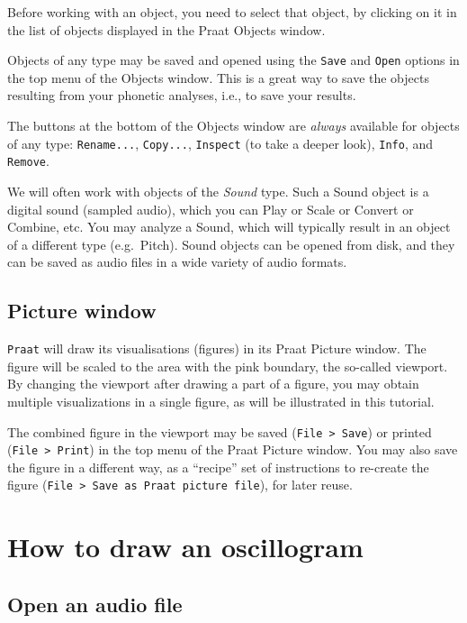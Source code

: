 \documentclass[
]{book}
\begin{document}
Before working with an object, you need to select that object, by clicking on it in the list of objects displayed in the Praat Objects window.

Objects of any type may be saved and opened using the \texttt{Save} and \texttt{Open} options in the top menu of the Objects window. This is a great way to save the objects resulting from your phonetic analyses, i.e., to save your results.

The buttons at the bottom of the Objects window are \emph{always} available for objects of any type: \texttt{Rename...}, \texttt{Copy...}, \texttt{Inspect} (to take a deeper look), \texttt{Info}, and \texttt{Remove}.

We will often work with objects of the \emph{Sound} type. Such a Sound object is a digital sound (sampled audio), which you can Play or Scale or Convert or Combine, etc. You may analyze a Sound, which will typically result in an object of a different type (e.g.~Pitch). Sound objects can be opened from disk, and they can be saved as audio files in a wide variety of audio formats.

\subsection*{Picture window}\label{picture-window}

\texttt{Praat} will draw its visualisations (figures) in its Praat Picture window. The figure will be scaled to the area with the pink boundary, the so-called viewport. By changing the viewport after drawing a part of a figure, you may obtain multiple visualizations in a single figure, as will be illustrated in this tutorial.

The combined figure in the viewport may be saved (\texttt{File\ \textgreater{}\ Save}) or printed (\texttt{File\ \textgreater{}\ Print}) in the top menu of the Praat Picture window.
You may also save the figure in a different way, as a ``recipe'' set of instructions to re-create the figure (\texttt{File\ \textgreater{}\ Save\ as\ Praat\ picture\ file}), for later reuse.

\label{box-open}
\section{How to draw an oscillogram}\label{how-to-draw-an-oscillogram}

\subsection{Open an audio file}\label{open-an-audio-file}
\end{document}
